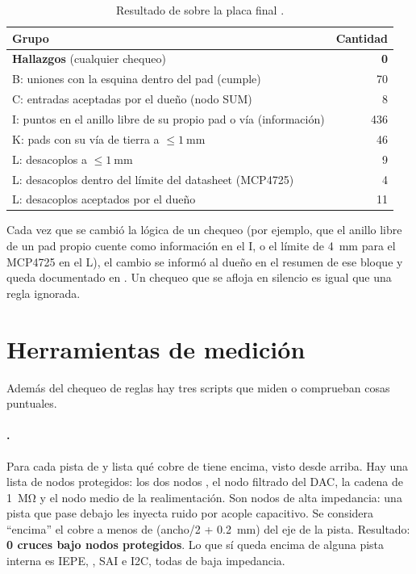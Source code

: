 \begin{table}[htbp]
\centering
\caption{Resultado de  sobre la placa final \medido.}\label{tab:c11-revisar}
\small
\begin{tabular}{@{}lr@{}}
\toprule
Grupo & Cantidad\\\midrule
\textbf{Hallazgos} (cualquier chequeo) & \textbf{0}\\
B: uniones con la esquina dentro del pad (cumple) & 70\\
C: entradas aceptadas por el dueño (nodo SUM) & 8\\
I: puntos en el anillo libre de su propio pad o vía (información) & 436\\
K: pads con su vía de tierra a $\le\SI{1}{\milli\meter}$ & 46\\
L: desacoplos a $\le\SI{1}{\milli\meter}$ & 9\\
L: desacoplos dentro del límite del datasheet (MCP4725) & 4\\
L: desacoplos aceptados por el dueño & 11\\
\bottomrule
\end{tabular}
\end{table}

\begin{ojo}
Cada vez que se cambió la lógica de un chequeo (por ejemplo, que el anillo libre de un pad propio cuente como
información en el I, o el límite de \SI{4}{\milli\meter} para el MCP4725 en el L), el cambio se informó al dueño en
el resumen de ese bloque y queda documentado en . Un chequeo que se afloja en silencio es
igual que una regla ignorada.
\end{ojo}

\section{Herramientas de medición}\label{sec:c11-medir}

Además del chequeo de reglas hay tres scripts que miden o comprueban cosas puntuales.

\paragraph{.} Para cada pista de  y  lista qué cobre de
 tiene encima, visto desde arriba. Hay una lista de nodos protegidos: los dos nodos , el nodo
filtrado del DAC, la cadena de \SI{1}{\mega\ohm} y el nodo medio de la realimentación. Son nodos de alta impedancia:
una pista que pase debajo les inyecta ruido por acople capacitivo. Se considera ``encima'' el cobre a menos de
(ancho/2 + \SI{0.2}{\milli\meter}) del eje de la pista. Resultado: \textbf{0 cruces bajo nodos protegidos}. Lo que sí
queda encima de alguna pista interna es IEPE, , SAI e I2C, todas de baja impedancia.

